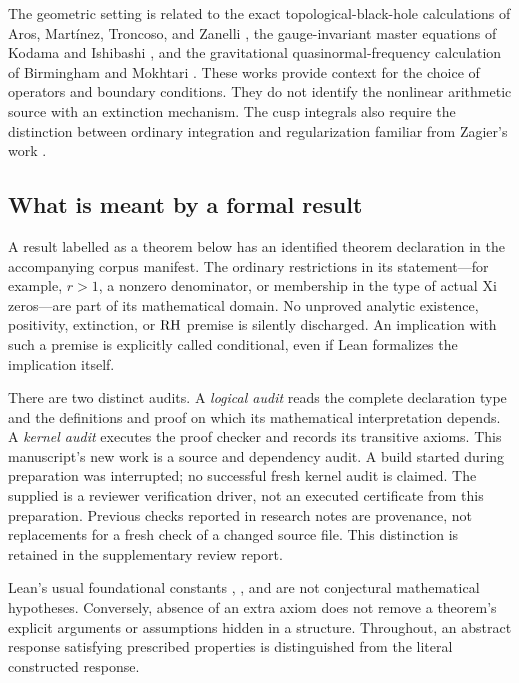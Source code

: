 The geometric setting is related to the exact topological-black-hole calculations of Aros, Mart\'inez, Troncoso, and Zanelli \cite{aros}, the gauge-invariant master equations of Kodama and Ishibashi \cite{ki}, and the gravitational quasinormal-frequency calculation of Birmingham and Mokhtari \cite{bm}. These works provide context for the choice of operators and boundary conditions. They do not identify the nonlinear arithmetic source with an extinction mechanism. The cusp integrals also require the distinction between ordinary integration and regularization familiar from Zagier's work \cite{zagier}.

\subsection{What is meant by a formal result}

A result labelled as a theorem below has an identified theorem declaration in the accompanying corpus manifest. The ordinary restrictions in its statement---for example, \(r>1\), a nonzero denominator, or membership in the type of actual Xi zeros---are part of its mathematical domain. No unproved analytic existence, positivity, extinction, or \(\mathrm{RH}\) premise is silently discharged. An implication with such a premise is explicitly called conditional, even if Lean formalizes the implication itself.

There are two distinct audits. A \emph{logical audit} reads the complete declaration type and the definitions and proof on which its mathematical interpretation depends. A \emph{kernel audit} executes the proof checker and records its transitive axioms. This manuscript's new work is a source and dependency audit. A build started during preparation was interrupted; no successful fresh kernel audit is claimed. The supplied  is a reviewer verification driver, not an executed certificate from this preparation. Previous checks reported in research notes are provenance, not replacements for a fresh check of a changed source file. This distinction is retained in the supplementary review report.

Lean's usual foundational constants , , and  are not conjectural mathematical hypotheses. Conversely, absence of an extra axiom does not remove a theorem's explicit arguments or assumptions hidden in a structure. Throughout, an abstract response satisfying prescribed properties is distinguished from the literal constructed response.

